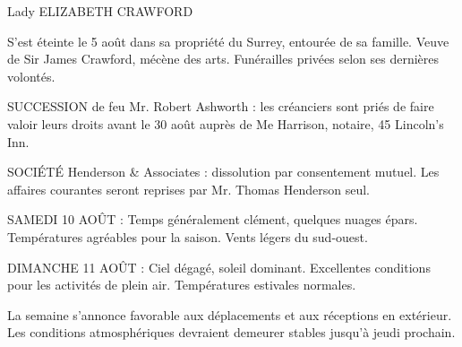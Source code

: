 \documentclass{news}
\begin{document}
Lady ELIZABETH CRAWFORD

S'est éteinte le 5 août dans sa propriété du Surrey, entourée de sa famille. Veuve de Sir James Crawford, mécène des arts. Funérailles privées selon ses dernières volontés.

SUCCESSION de feu Mr. Robert Ashworth : les créanciers sont priés de faire valoir leurs droits avant le 30 août auprès de Me Harrison, notaire, 45 Lincoln's Inn.

SOCIÉTÉ Henderson \& Associates : dissolution par consentement mutuel. Les affaires courantes seront reprises par Mr. Thomas Henderson seul.


SAMEDI 10 AOÛT : Temps généralement clément, quelques nuages épars. Températures agréables pour la saison. Vents légers du sud-ouest.

DIMANCHE 11 AOÛT : Ciel dégagé, soleil dominant. Excellentes conditions pour les activités de plein air. Températures estivales normales.

La semaine s'annonce favorable aux déplacements et aux réceptions en extérieur. Les conditions atmosphériques devraient demeurer stables jusqu'à jeudi prochain.
\end{document}
